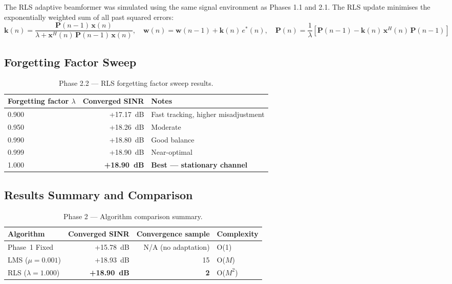 \documentclass[11pt,a4paper]{article}
\begin{document}
The RLS adaptive beamformer was simulated using the same signal environment
as Phases 1.1 and 2.1. The RLS update minimises the exponentially weighted
sum of all past squared errors:
\[
    \mathbf{k}(n) = \frac{\mathbf{P}(n-1)\,\mathbf{x}(n)}
                         {\lambda + \mathbf{x}^H(n)\,\mathbf{P}(n-1)\,\mathbf{x}(n)},
    \quad
    \mathbf{w}(n) = \mathbf{w}(n-1) + \mathbf{k}(n)\,e^*(n),
    \quad
    \mathbf{P}(n) = \frac{1}{\lambda}\left[\mathbf{P}(n-1)
                   - \mathbf{k}(n)\,\mathbf{x}^H(n)\,\mathbf{P}(n-1)\right]
\]

\subsection{Forgetting Factor Sweep}

\begin{table}[H]
\centering
\begin{tabular}{lrl}
\toprule
\textbf{Forgetting factor $\lambda$} & \textbf{Converged SINR} & \textbf{Notes} \\
\midrule
0.900 & +17.17~dB & Fast tracking, higher misadjustment \\
0.950 & +18.26~dB & Moderate \\
0.990 & +18.80~dB & Good balance \\
0.999 & +18.90~dB & Near-optimal \\
1.000 & \textbf{+18.90~dB} & \textcolor{passgreen}{\textbf{Best — stationary channel}} \\
\bottomrule
\end{tabular}
\caption{Phase 2.2 --- RLS forgetting factor sweep results.}
\end{table}

\subsection{Results Summary and Comparison}

\begin{table}[H]
\centering
\begin{tabular}{lrrl}
\toprule
\textbf{Algorithm} & \textbf{Converged SINR} & \textbf{Convergence sample} & \textbf{Complexity} \\
\midrule
Phase~1 Fixed  & +15.78~dB & N/A (no adaptation) & O(1) \\
LMS ($\mu=0.001$) & +18.93~dB & 15 & O($M$) \\
RLS ($\lambda=1.000$) & \textbf{+18.90~dB} & \textbf{2} & O($M^2$) \\
\bottomrule
\end{tabular}
\caption{Phase 2 --- Algorithm comparison summary.}
\end{table}
\end{document}
